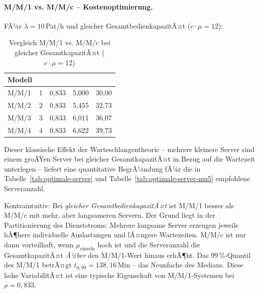 ﻿\documentclass[a4paper,12pt]{report}
\theoremstyle{definition}
\begin{document}
\paragraph{M/M/1 vs. M/M/c -- Kostenoptimierung.}
FÃ¼r $\lambda = 10$\,Pat/h und gleicher GesamtbedienkapazitÃ¤t ($c \cdot \mu = 12$):

\begin{table}[H]
	\centering
	\begin{tabular}{@{}lrrrr@{}}
		\toprule
		\textbf{Modell} & \boldmath{$c$} & \boldmath{$\rho$} &
		\boldmath{$L$} & \boldmath{$W$ (Min)} \\
		\midrule
		M/M/1 & 1 & 0{,}833 & 5{,}000 & 30{,}00 \\
		M/M/2 & 2 & 0{,}833 & 5{,}455 & 32{,}73 \\
		M/M/3 & 3 & 0{,}833 & 6{,}011 & 36{,}07 \\
		M/M/4 & 4 & 0{,}833 & 6{,}622 & 39{,}73 \\
		\bottomrule
	\end{tabular}
	\caption{Vergleich M/M/1 vs. M/M/c bei gleicher GesamtkapazitÃ¤t ($c \cdot \mu = 12$)}
\label{tab:mm1-vs-mmc}
	\label{tab:mmc-vergleich}
\end{table}

Dieser klassische Effekt der Warteschlangentheorie -- mehrere kleinere Server sind einem groÃŸen Server bei gleicher GesamtkapazitÃ¤t in Bezug auf die Wartezeit unterlegen -- liefert eine quantitative BegrÃ¼ndung fÃ¼r die in Tabelle~\ref{tab:optimale-server} und Tabelle~\ref{tab:optimale-server-mu5} empfohlene Serveranzahl.

Kontraintuitiv: Bei \emph{gleicher GesamtbedienkapazitÃ¤t} ist M/M/1 besser
als M/M/c mit mehr, aber langsameren Servern. Der Grund liegt in der
Partitionierung des Dienststroms: Mehrere langsame Server erzeugen
jeweils hÃ¶here individuelle Auslastungen und lÃ¤ngere Wartezeiten.
M/M/c ist nur dann vorteilhaft, wenn $\mu_\text{einzeln}$ hoch ist und
die Serveranzahl die GesamtkapazitÃ¤t \emph{Ã¼ber} den M/M/1-Wert hinaus
erhÃ¶ht. Das 99\,\%-Quantil des M/M/1 betrÃ¤gt $t_{0{,}99} = 138{,}16$\,Min
-- das Neunfache des Medians. Diese hohe VariabilitÃ¤t ist eine typische
Eigenschaft von M/M/1-Systemen bei $\rho = 0{,}833$.
\end{document}

